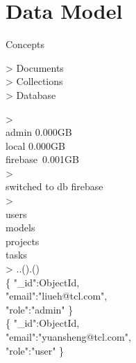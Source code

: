 \documentclass{beamer}
\begin{document}
\section{Data Model}
\begin{frame}{Concepts}

\begin{minipage}[t]{0.4\textwidth}
	\begin{Alms*}
		> Documents \\
		> Collections \\
		> Database \\
		
	\end{Alms*}
\end{minipage}
\hfill
\begin{minipage}[t]{0.6\textwidth}
	\scriptsize
	\begin{Alms*}
		>   \\
		admin \qquad 0.000GB\\
		local \qquad 0.000GB\\
		firebase \,0.001GB\\
		>   \\
		switched to db firebase \\
		>   \\
		users \\
		models \\
		projects \\
		tasks \\
		> ..().() \\
		\{ \NI
		"\_id":ObjectId, \\
		"email":"liueh@tcl.com", \\
		"role":"admin"
		\ND \} \\
		\{ \NI
		"\_id":ObjectId, \\
		"email":"yuansheng@tcl.com", \\
		"role":"user"
		\ND \}
	\end{Alms*}
\end{minipage}

\end{frame}
\end{document}
